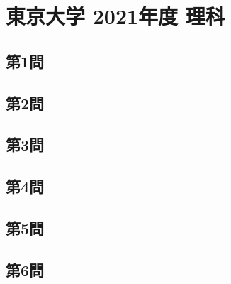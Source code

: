 ﻿\documentclass[../../uem_tok_q.tex]{subfiles}
\begin{document}
    \section{東京大学 2021年度 理科}

    \subsection{第1問}
    

    \vfill
    \subsection{第2問}
    

    \vfill
    \newpage
    \subsection{第3問}
    

    \vfill
    \subsection{第4問}
    

    \vfill
    \newpage
    \subsection{第5問}
    

    \vfill
    \subsection{第6問}
    

    \vfill
\end{document}
